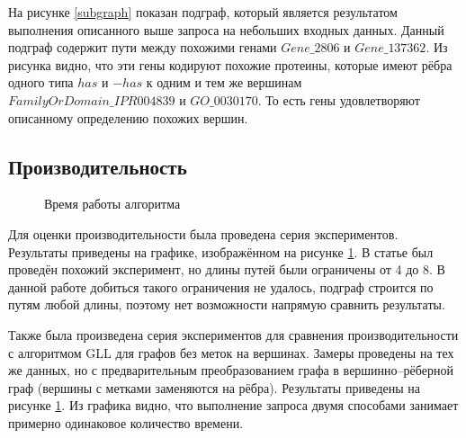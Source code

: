 \documentclass[14pt]{matmex-diploma}
\begin{document}
На рисунке \ref{subgraph} показан подграф, который является результатом выполнения описанного выше запроса на небольших входных данных. Данный подграф содержит пути между похожими генами $Gene\_2806$ и $Gene\_137362$. Из рисунка видно, что эти гены кодируют похожие протеины, которые имеют рёбра одного типа $has$ и $-has$ к одним и тем же вершинам $FamilyOrDomain\_IPR004839$ и $GO\_0030170$. То есть гены удовлетворяют описанному определению похожих вершин.

\subsection{Производительность}

\begin{figure}
\begin{center}
\end{center}
\caption{Время работы алгоритма}
\label{time}
\end{figure}

Для оценки производительности была проведена серия экспериментов. Результаты приведены на графике, изображённом на рисунке \ref{time}. В статье \cite{subgraph} был проведён похожий эксперимент, но длины путей были ограничены от 4 до 8. В данной работе добиться такого ограничения не удалось, подграф строится по путям любой длины, поэтому нет возможности напрямую сравнить результаты.

Также была произведена серия экспериментов для сравнения производительности с алгоритмом GLL для графов без меток на вершинах. Замеры проведены на тех же данных, но с предварительным преобразованием графа в вершинно--рёберной граф (вершины с метками заменяются на рёбра). Результаты приведены на рисунке \ref{time}. Из графика видно, что выполнение запроса двумя способами занимает примерно одинаковое количество времени.
\end{document}
